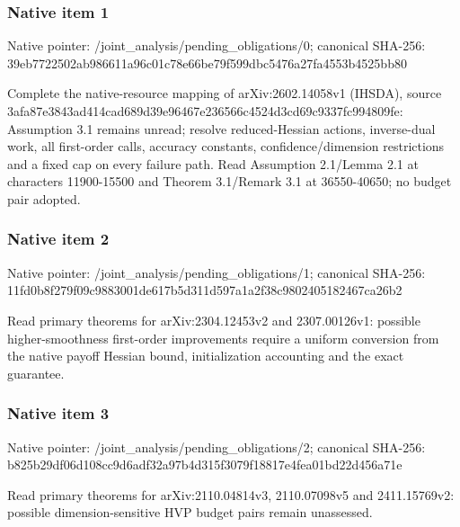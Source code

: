 \documentclass[10pt,a4paper]{article}
\begin{document}
\subsubsection{Native item 1}
Native pointer: /joint\_\allowbreak{}analysis/pending\_\allowbreak{}obligations/0; canonical SHA-256: 39eb7722502ab986611a96c01c78e66be79f599dbc5476a27fa4553b4525bb80

\begingroup\raggedright\sloppy Complete the native-resource mapping of arXiv:\allowbreak{}2602.14058v1 (IHSDA),\allowbreak{} source 3afa87e3843ad414cad689d39e96467e236566c4524d3cd69c9337fc994809fe:\allowbreak{} Assumption 3.1 remains unread;\allowbreak{} resolve reduced-Hessian actions,\allowbreak{} inverse-dual work,\allowbreak{} all first-order calls,\allowbreak{} accuracy constants,\allowbreak{} confidence/\allowbreak{}dimension restrictions and a fixed cap on every failure path. Read Assumption 2.1/\allowbreak{}Lemma 2.1 at characters 11900-15500 and Theorem 3.1/\allowbreak{}Remark 3.1 at 36550-40650;\allowbreak{} no budget pair adopted.\par\endgroup

\subsubsection{Native item 2}
Native pointer: /joint\_\allowbreak{}analysis/pending\_\allowbreak{}obligations/1; canonical SHA-256: 11fd0b8f279f09c9883001de617b5d311d597a1a2f38c9802405182467ca26b2

\begingroup\raggedright\sloppy Read primary theorems for arXiv:\allowbreak{}2304.12453v2 and 2307.00126v1:\allowbreak{} possible higher-smoothness first-order improvements require a uniform conversion from the native payoff Hessian bound,\allowbreak{} initialization accounting and the exact guarantee.\par\endgroup

\subsubsection{Native item 3}
Native pointer: /joint\_\allowbreak{}analysis/pending\_\allowbreak{}obligations/2; canonical SHA-256: b825b29df06d108cc9d6adf32a97b4d315f3079f18817e4fea01bd22d456a71e

\begingroup\raggedright\sloppy Read primary theorems for arXiv:\allowbreak{}2110.04814v3,\allowbreak{} 2110.07098v5 and 2411.15769v2:\allowbreak{} possible dimension-sensitive HVP budget pairs remain unassessed.\par\endgroup
\end{document}
